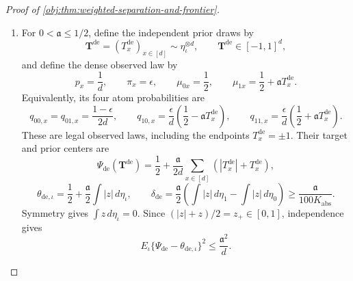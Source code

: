 \documentclass[11pt]{article}
\begin{document}
\begin{proof}[Proof of \cref{obj:thm:weighted-separation-and-frontier}]
\begin{enumerate}
\item
For \(0<\mathfrak a\le1/2\), define the independent prior draws by
\[
\mathbf T^{\mathrm{de}}
=(T_x^{\mathrm{de}})_{x\in[d]}
\sim\eta_\iota^{\otimes d},
\qquad
\mathbf T^{\mathrm{de}}\in[-1,1]^d,
\]
and define the dense observed law by
\[
p_x=\frac1d,
\qquad
\pi_x=\epsilon,
\qquad
\mu_{0x}=\frac12,
\qquad
\mu_{1x}=\frac12+\mathfrak a T_x^{\mathrm{de}}.
\]
Equivalently, its four atom probabilities are
\[
q_{00,x}=q_{01,x}=\frac{1-\epsilon}{2d},
\qquad
q_{10,x}=\frac{\epsilon}{d}\left(\frac12-\mathfrak a T_x^{\mathrm{de}}\right),
\qquad
q_{11,x}=\frac{\epsilon}{d}\left(\frac12+\mathfrak a T_x^{\mathrm{de}}\right).
\]
These are legal observed laws, including the endpoints \(T_x^{\mathrm{de}}=\pm1\).
Their target and prior centers are
\[
\Psi_{\mathrm{de}}(\mathbf T^{\mathrm{de}})
=\frac12+\frac{\mathfrak a}{2d}
 \sum_{x\in[d]}(|T_x^{\mathrm{de}}|+T_x^{\mathrm{de}}),
\]
\[
\theta_{\mathrm{de},\iota}
=\frac12+\frac{\mathfrak a}{2}\int|z|\,d\eta_\iota,
\qquad
\delta_{\mathrm{de}}
=\frac{\mathfrak a}{2}
 \left(\int|z|\,d\eta_1-\int|z|\,d\eta_0\right)
\ge\frac{\mathfrak a}{100K_{\mathrm{abs}}}.
\]
Symmetry gives \(\int z\,d\eta_\iota=0\). Since
\((|z|+z)/2=z_+\in[0,1]\), independence gives
\[
E_\iota\{\Psi_{\mathrm{de}}-\theta_{\mathrm{de},\iota}\}^2
\le\frac{\mathfrak a^2}{d}.
\]


\end{enumerate}
\end{proof}
\end{document}
